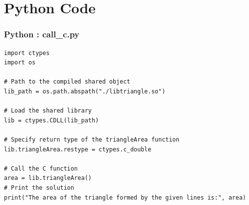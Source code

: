 \documentclass{beamer}
\theoremstyle{remark}
\numberwithin{equation}{section}
\begin{document}
\section{Python Code}
\begin{frame}[fragile]
\frametitle{Python : call\_c.py}
\begin{lstlisting}
import ctypes
import os

# Path to the compiled shared object
lib_path = os.path.abspath("./libtriangle.so")

# Load the shared library
lib = ctypes.CDLL(lib_path)

# Specify return type of the triangleArea function
lib.triangleArea.restype = ctypes.c_double

# Call the C function
area = lib.triangleArea()
# Print the solution
print("The area of the triangle formed by the given lines is:", area)

\end{lstlisting}
\end{frame}
\end{document}

